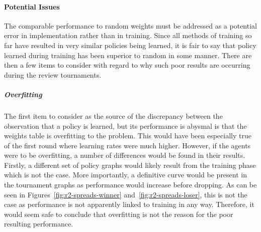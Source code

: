 
\paragraph*{Potential Issues}
\label{sec:findings-r2-potentialissues}

The comparable performance to random weights must be addressed as a potential
error in implementation rather than in training.
%
Since all methods of training so far have resulted in very similar policies
being learned,
it is fair to say that policy learned during training has been superior to
random in some manner.
%
There are then a few items to consider with regard to why such poor results are occurring
during the review tournaments.


\subparagraph*{Overfitting}

The first item to consider as the source of the discrepancy between the
observation that a policy is learned,
but its performance is abysmal
is that the weights table is overfitting to the problem.
%
This would have been especially true of the first round where learning rates
were much higher.
%
However,
if the agents were to be overfitting,
a number of differences would be found in their results.
%
Firstly,
a different set of policy graphs would likely result from the training phase
which is not the case. %
%
More importantly,
a definitive curve would be present in the tournament graphs as performance
would increase before dropping.
%
As can be seen in Figures~\ref{fig:r2-spreads-winner}
and~\ref{fig:r2-spreads-loser},
this is not the case
as performance is not apparently linked to training in any way.
%
Therefore, it would seem safe to conclude that overfitting is not the reason
for the poor resulting performance.

